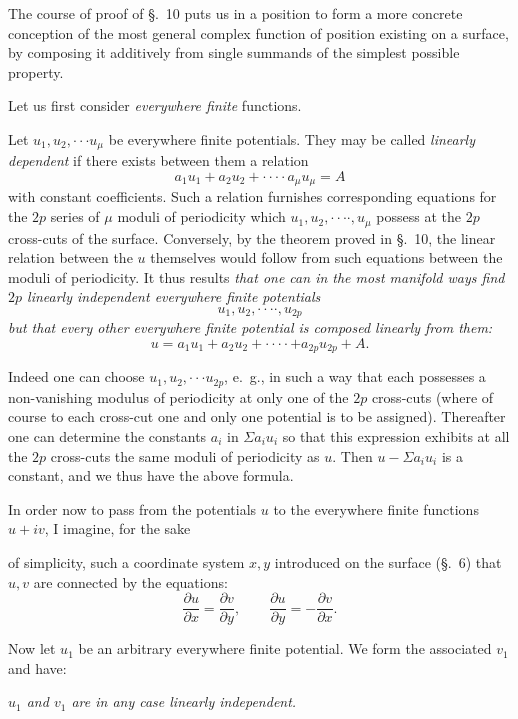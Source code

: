 \documentclass{article}
\begin{document}
The course of proof of §.~10 puts us in a position to form a more concrete conception of the most general complex function of position existing on a surface, by composing it additively from single summands of the simplest possible property.

Let us first consider \emph{everywhere finite} functions.

Let $u_{1}, u_{2}, \cdot\cdot\cdot u_{\mu}$ be everywhere finite potentials. They may be called \emph{linearly dependent} if there exists between them a relation
\[ a_{1}u_{1} + a_{2}u_{2} + \cdot\cdot\cdot\cdot a_{\mu}u_{\mu} = A \]
with constant coefficients. Such a relation furnishes corresponding equations for the $2p$ series of $\mu$ moduli of periodicity which $u_{1}, u_{2}, \cdot\cdot\cdot\cdot, u_{\mu}$ possess at the $2p$ cross-cuts of the surface. Conversely, by the theorem proved in §.~10, the linear relation between the $u$ themselves would follow from such equations between the moduli of periodicity. It thus results \emph{that one can in the most manifold ways find $2p$ linearly independent everywhere finite potentials}
\[ u_{1}, u_{2}, \cdot\cdot\cdot\cdot, u_{2p} \]
\emph{but that every other everywhere finite potential is composed linearly from them:}
\[ u = a_{1}u_{1} + a_{2}u_{2} + \cdot\cdot\cdot\cdot + a_{2p}u_{2p} + A. \]

Indeed one can choose $u_{1}, u_{2}, \cdot\cdot\cdot u_{2p}$, e.\ g., in such a way that each possesses a non-vanishing modulus of periodicity at only one of the $2p$ cross-cuts (where of course to each cross-cut one and only one potential is to be assigned). Thereafter one can determine the constants $a_{i}$ in $\Sigma a_{i}u_{i}$ so that this expression exhibits at all the $2p$ cross-cuts the same moduli of periodicity as $u$. Then $u - \Sigma a_{i}u_{i}$ is a constant, and we thus have the above formula.

In order now to pass from the potentials $u$ to the everywhere finite functions $u + iv$, I imagine, for the sake

of simplicity, such a coordinate system $x, y$ introduced on the surface (§.~6) that $u, v$ are connected by the equations:
\[ \frac{\partial u}{\partial x} = \frac{\partial v}{\partial y}, \qquad \frac{\partial u}{\partial y} = - \frac{\partial v}{\partial x}. \]

Now let $u_{1}$ be an arbitrary everywhere finite potential. We form the associated $v_{1}$ and have:

\emph{$u_{1}$ and $v_{1}$ are in any case linearly independent.}
\end{document}
